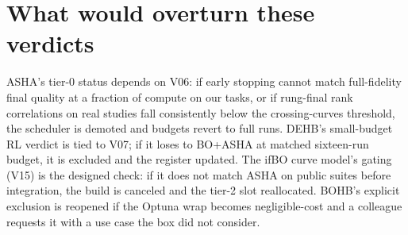 \section{What would overturn these verdicts}

ASHA's tier-0 status depends on V06: if early stopping cannot match
full-fidelity final quality at a fraction of compute on our tasks,
or if rung-final rank correlations on real studies fall consistently
below the crossing-curves threshold, the scheduler is demoted and
budgets revert to full runs. DEHB's small-budget RL verdict is tied
to V07; if it loses to BO+ASHA at matched sixteen-run budget, it is
excluded and the register updated. The ifBO curve model's gating
(V15) is the designed check: if it does not match ASHA on public
suites before integration, the build is canceled and the tier-2 slot
reallocated. BOHB's explicit exclusion is reopened if the Optuna
wrap becomes negligible-cost and a colleague requests it with a use
case the box did not consider.
